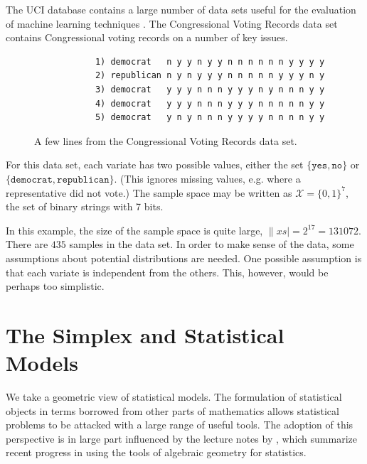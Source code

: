 \documentclass[cclicense]{hmcthesis}
\providecommand*{\xs}{\mathcal X}
\numberwithin{equation}{chapter}
\numberwithin{thmcounter}{chapter}
\begin{document}
    \begin{example}
        The UCI database contains a large number of data sets useful for the
        evaluation of machine learning techniques \citep{UCIData}.  The
        Congressional Voting Records data set contains Congressional voting
        records on a number of key issues.
        \begin{figure}[H]
            \centering
            \begin{verbatim}
            1) democrat   n y y n y y n n n n n n y y y y
            2) republican n y n y y y n n n n n y y y n y
            3) democrat   y y y n n n y y y n y n n n y y
            4) democrat   y y y n n n y y y n n n n n y y
            5) democrat   y n y n n n y y y y n n n n y y
            \end{verbatim}
            \vspace{-1.5\baselineskip}
            \caption{A few lines from the Congressional Voting Records
            data set.}
        \end{figure}
        \noindent For this data set, each variate has two possible values,
        either the set $\{\texttt{yes}, \texttt{no}\}$ or $\{\texttt{democrat},
        \texttt{republican}\}$.  (This ignores missing values, e.g.  where a
        representative did not vote.)  The sample space may be written as $\xs =
        \{0, 1\}^7$, the set of binary strings with 7 bits.  
        
        In this example, the size of the sample space is quite large, $\|xs| =
        2^{17} = 131072$.  There are $435$ samples in the data set.  In order to
        make sense of the data, some assumptions about potential distributions
        are needed.  One possible assumption is that each variate is independent
        from the others.  This, however, would be perhaps too simplistic.
        \label{ex:binary-voting}
    \end{example}


    \section{The Simplex and Statistical Models}

    We take a geometric view of statistical models.  The formulation of
    statistical objects in terms borrowed from other parts of mathematics allows
    statistical problems to be attacked with a large range of useful tools.  The
    adoption of this perspective is in large part influenced by the lecture
    notes by \citet{DSS08}, which summarize recent progress in using the tools
    of algebraic geometry for statistics.
\end{document}

